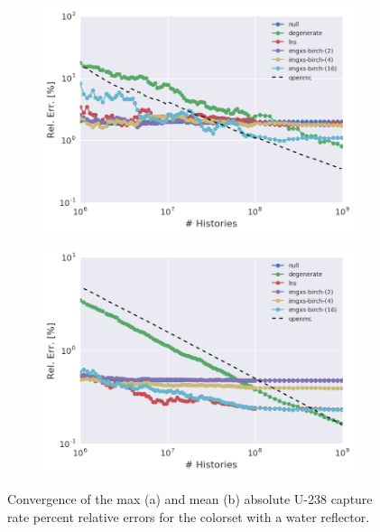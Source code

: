 \begin{figure}[h!]
\centering
\begin{subfigure}{\textwidth}
  \centering
  \includegraphics[width=0.9\linewidth]{figures/results/convergence/reflector/max-capt-err-evo}
  \caption{}
  \label{fig:chap11-refl-capture-converge-max}
\end{subfigure}
\begin{subfigure}{\textwidth}
  \centering
  \includegraphics[width=0.9\linewidth]{figures/results/convergence/reflector/mean-capt-err-evo}
  \caption{}
  \label{fig:chap11-refl-capture-converge-mean}
\end{subfigure}
\vspace{2mm}
\caption[Fission rate covergence for a 2$\times$2 colorset with reflector]{Convergence of the max (a) and mean (b) absolute U-238 capture rate percent relative errors for the colorset with a water reflector.}
\label{fig:chap11-refl-capture-converge}
\end{figure}


